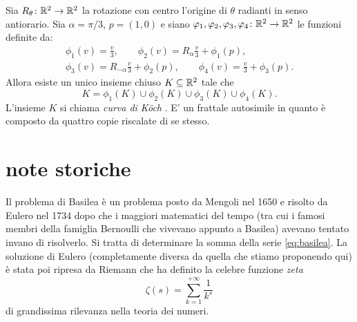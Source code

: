 \begin{example}[curva di K{\"o}ch]
Sia $R_\theta\colon {\mathbb R}^2 \to {\mathbb R}^2$ la rotazione con centro l'origine di $\theta$ radianti in senso antiorario.
Sia $\alpha = \pi/3$, $p=(1,0)$ e
siano $\varphi_1, \varphi_2, \varphi_3, \varphi_4 \colon {\mathbb R}^2 \to {\mathbb R}^2$
le funzioni definite da:
\begin{align*}
\phi_1(v) = \frac{v}{3}, \qquad
\phi_2(v) = R_{\alpha}\frac{v}{3} + \phi_1(p), \\
\phi_3(v) = R_{-\alpha}\frac{v}{3} + \phi_2(p), \qquad
\phi_4(v) = \frac{v}{3} + \phi_3(p).
\end{align*}
Allora esiste un unico insieme chiuso $K\subseteq {\mathbb R}^2$ tale che
\[
  K = \phi_1(K) \cup \phi_2(K) \cup \phi_3(K) \cup \phi_4(K).
\]
L'insieme $K$ si chiama \emph{curva di K{\"o}ch}%
%
. 
E' un frattale autosimile in quanto è composto da quattro copie riscalate di se stesso.
\end{example}

\section{note storiche}

\label{note:Basilea}%
Il problema di Basilea è un problema posto da Mengoli nel 1650 
e risolto da Eulero nel 1734 dopo che i maggiori matematici del tempo 
(tra cui i famosi membri della famiglia Bernoulli che vivevano appunto a Basilea) 
avevano tentato invano di risolverlo. 
Si tratta di determinare la somma della serie \eqref{eq:basilea}.
La soluzione di Eulero (completamente diversa da quella che stiamo proponendo qui)
è stata poi ripresa da Riemann che ha definito la celebre funzione \emph{zeta}
%
%
%
%
%
%
\[
\zeta(s) = \sum_{k=1}^{+\infty} \frac{1}{k^s}  
\]
di grandissima rilevanza nella teoria dei numeri.
